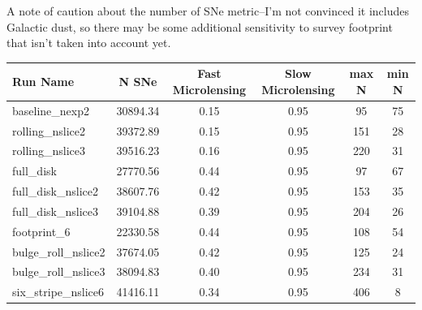\documentclass[modern]{aastex62}
\begin{document}
A note of caution about the number of SNe metric--I'm not convinced it includes Galactic dust, so there may be some additional sensitivity to survey footprint that isn't taken into account yet.


\begin{table}
\begin{tabular}{lccccc}

 Run Name &  N SNe &  Fast Microlensing &  Slow Microlensing &  max N &  min N \\
\toprule

baseline\_nexp2 &             30894.34 &                    0.15 &                    0.95 &     95 &     75 \\
rolling\_nslice2 &             39372.89 &                    0.15 &                    0.95 &    151 &     28 \\
rolling\_nslice3 &             39516.23 &                    0.16 &                    0.95 &    220 &     31 \\


\hline
full\_disk &             27770.56 &                    0.44 &                    0.95 &     97 &     67 \\
full\_disk\_nslice2 &             38607.76 &                    0.42 &                    0.95 &    153 &     35 \\
full\_disk\_nslice3 &             39104.88 &                    0.39 &                    0.95 &    204 &     26 \\
                                
                                   
\hline
footprint\_6 &             22330.58 &                    0.44 &                    0.95 &    108 &     54 \\
bulge\_roll\_nslice2 &             37674.05 &                    0.42 &                    0.95 &    125 &     24 \\
bulge\_roll\_nslice3 &             38094.83 &                    0.40 &                    0.95 &    234 &     31 \\
six\_stripe\_nslice6 &             41416.11 &                    0.34 &                    0.95 &    406 &      8 \\
\hline
\end{tabular}
\end{table}
\end{document}
